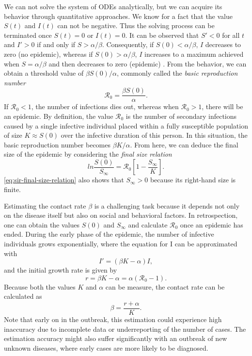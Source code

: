 We can not solve the system of \glspl{ODE} analytically, but we can acquire its behavior through quantitative approaches.
We know for a fact that the value $S(t)$ and $I(t)$ can not be negative.
Thus the solving process can be terminated once $S(t) = 0$ or $I(t) = 0$.
It can be observed that $S' < 0$ for all $t$ and $I' > 0$ if and only if $S > \alpha / \beta$.
Consequently, if $S(0) < \alpha / \beta$, $I$ decreases to zero (no epidemic), whereas if $S(0) > \alpha / \beta$, $I$ increases to a maximum achieved when $S = \alpha / \beta$ and then decreases to zero (epidemic) \cite{brauerCompartmentalModelsEpidemiology2008}.
From the behavior, we can obtain a threshold value of $\beta S(0) / \alpha$, commonly called the \textit{basic reproduction number}
\begin{equation*}
    \mathcal{R}_0 = \frac{\beta S(0)}{\alpha}.
\end{equation*}
If $\mathcal{R}_0 < 1$, the number of infections dies out, whereas when $\mathcal{R}_0 > 1$, there will be an epidemic.
By definition, the value $\mathcal{R}_0$ is the number of secondary infections caused by a single infective individual placed within a fully susceptible population of size $K \approx S(0)$ over the infective duration of this person.
In this situation, the basic reproduction number becomes $\beta K / \alpha$.
From here, we can deduce the final size of the epidemic by considering the \textit{final size relation} \cite{brauerCompartmentalModelsEpidemiology2008}
\begin{equation}
    ln \frac{S(0)}{S_\infty} = \mathcal{R}_0 \left[ 1 - \frac{S_\infty}{K} \right].
    \label{eq:sir-final-size-relation}
\end{equation}
\autoref{eq:sir-final-size-relation} also shows that $S_\infty > 0$ because its right-hand size is finite.

Estimating the contact rate $\beta$ is a challenging task because it depends not only on the disease itself but also on social and behavioral factors.
In retrospection, one can obtain the values $S(0)$ and $S_\infty$ and calculate $\mathcal{R}_0$ once an epidemic has ended.
During the early phase of the epidemic, the number of infective individuals grows exponentially, where the equation for I can be approximated with \cite{brauerCompartmentalModelsEpidemiology2008}
\begin{equation*}
    I' = (\beta K - \alpha) I,
\end{equation*}
and the initial growth rate is given by
\begin{equation*}
    r = \beta K - \alpha = \alpha (\mathcal{R}_0 - 1).
\end{equation*}
Because both the values $K$ and $\alpha$ can be measure, the contact rate can be calculated as \cite{brauerCompartmentalModelsEpidemiology2008}
\begin{equation*}
    \beta = \frac{r + \alpha}{K}.
\end{equation*}
Note that early on in the outbreak, this estimation could experience high inaccuracy due to incomplete data or underreporting of the number of cases.
The estimation accuracy might also suffer significantly with an outbreak of new unknown diseases, where early cases are more likely to be diagnosed.

